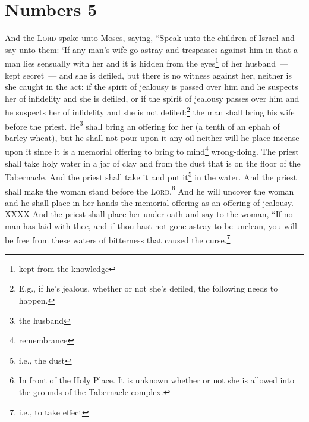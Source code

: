 \section{Numbers 5}\label{Numbers 5}
\begin{enumerate}[align=center]
     And the \textsc{Lord} spake unto Moses, saying,%
     ``Speak unto the children of Israel and say unto them: `If any man's wife go astray and trespasses against him%
     in that a man lies sensually with her and it is hidden from the eyes\footnote{kept from the knowledge} of her husband~--- kept secret~--- and she is defiled, but there is no witness against her, neither is she caught in the act:%
     if the spirit of jealousy is passed over him and he suspects her of infidelity and she is defiled, or if the spirit of jealousy passes over him and he suspects her of infidelity and she is not defiled:\footnote{E.g., if he's jealous, whether or not she's defiled, the following needs to happen.}%
     the man shall bring his wife before the priest. He\footnote{the husband} shall bring an offering for her (a tenth of an ephah of barley wheat), but he shall not pour upon it any oil neither will he place incense upon it since it is a memorial offering to bring to mind\footnote{remembrance} wrong-doing.%
     The priest shall take holy water in a jar of clay and from the dust that is on the floor of the Tabernacle. And the priest shall take it and put it\footnote{i.e., the dust} in the water.%
     And the priest shall make the woman stand before the \textsc{Lord}.\footnote{In front of the Holy Place. It is unknown whether or not she is allowed into the grounds of the Tabernacle complex.} And he will uncover the woman and he shall place in her hands the memorial offering as an offering of jealousy. XXXX%
     And the priest shall place her under oath and say to the woman, ``If no man has laid with thee, and if thou hast not gone astray to be unclean, you will be free from these waters of bitterness that caused the curse.\footnote{i.e., to take effect}%

\end{enumerate}

